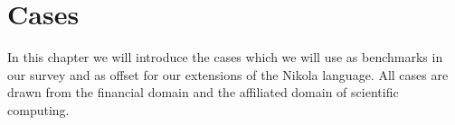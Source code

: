 \chapter{Cases}
\label{chap:cases}

In this chapter we will introduce the cases which we will use as
benchmarks in our survey and as offset for our extensions of the
Nikola language. All cases are drawn from the financial domain and the
affiliated domain of scientific computing.






